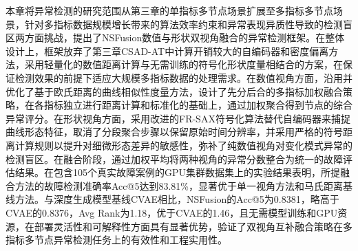 本章将异常检测的研究范围从第三章的单指标多节点场景扩展至多指标多节点场景，针对多指标数据规模增长带来的算法效率约束和异常表现异质性导致的检测盲区两方面挑战，提出了NSFusion数值与形状双视角融合的异常检测框架。在整体设计上，框架放弃了第三章CSAD-AT中计算开销较大的自编码器和密度偏离方法，采用轻量化的数值距离计算与无需训练的符号化形状度量相结合的方案，在保证检测效果的前提下适应大规模多指标数据的处理需求。在数值视角方面，沿用并优化了基于欧氏距离的曲线相似性度量方法，设计了先分后合的多指标加权融合策略，在各指标独立进行距离计算和标准化的基础上，通过加权聚合得到节点的综合异常评分。在形状视角方面，采用改进的FR-SAX符号化算法替代自编码器来捕捉曲线形态特征，取消了分段聚合步骤以保留原始时间分辨率，并采用严格的符号距离计算规则以提升对细微形态差异的敏感性，弥补了纯数值视角对变化模式异常的检测盲区。在融合阶段，通过加权平均将两种视角的异常分数整合为统一的故障评估结果。在包含105个真实故障案例的GPU集群数据集上的实验结果表明，所提融合方法的故障检测准确率Acc@5达到83.81\%，显著优于单一视角方法和马氏距离基线方法。与深度生成模型基线CVAE相比，NSFusion的Acc@5为0.8381，略高于CVAE的0.8376，Avg Rank为1.18，优于CVAE的1.46，且无需模型训练和GPU资源，在部署灵活性和可解释性方面具有显著优势，验证了双视角互补融合策略在多指标多节点异常检测任务上的有效性和工程实用性。
